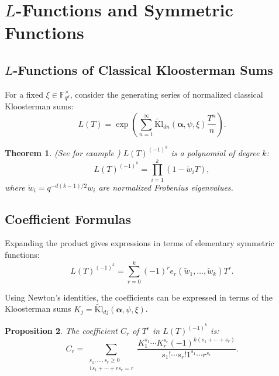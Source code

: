 \documentclass[11pt]{article}
\newtheorem{theorem}{Theorem}[section]
\newtheorem{proposition}[theorem]{Proposition}
\newcommand{\Fqd}{\mathbb{F}_{q^d}}
\newcommand{\tKl}{\widetilde{\mathrm{Kl}}}
\begin{document}
\section{$L$-Functions and Symmetric Functions}
\label{sec:lfunctions}

\subsection{$L$-Functions of Classical Kloosterman Sums}

For a fixed $\xi \in \Fqd^\times$, consider the generating series of normalized classical Kloosterman sums:
\[
L(T) = \exp\left( \sum_{n=1}^\infty \tKl_{dn}(\bm{\alpha}, \psi, \xi) \frac{T^n}{n} \right).
\]

\begin{theorem}(See for example \cite{fu2005lfunctions})
\label{thm:L_function}
$L(T)^{(-1)^k}$ is a polynomial of degree $k$:
\[
L(T)^{(-1)^k} = \prod_{i=1}^k (1 - \widetilde{w}_i T),
\]
where $\widetilde{w}_i = q^{-d(k-1)/2} w_i$ are normalized Frobenius eigenvalues.
\end{theorem}


\subsection{Coefficient Formulas}

Expanding the product gives expressions in terms of elementary symmetric functions:
\[
L(T)^{(-1)^k} = \sum_{r=0}^k (-1)^r e_r(\widetilde{w}_1, \ldots, \widetilde{w}_k) T^r.
\]

Using Newton's identities, the coefficients can be expressed in terms of the Kloosterman sums $K_j = \tKl_{dj}(\bm{\alpha}, \psi, \xi)$.
\medskip

\begin{proposition}
The coefficient $C_r$ of $T^r$ in $L(T)^{(-1)^k}$ is:
\[
C_r = \sum_{\substack{s_1, \ldots, s_r \geq 0 \\ 1s_1 + \cdots + rs_r = r}} \frac{K_1^{s_1} \cdots K_r^{s_r} (-1)^{k(s_1 + \cdots + s_r)}}{s_1! \cdots s_r! 1^{s_1} \cdots r^{s_r}}.
\]
\end{proposition}
\end{document}
